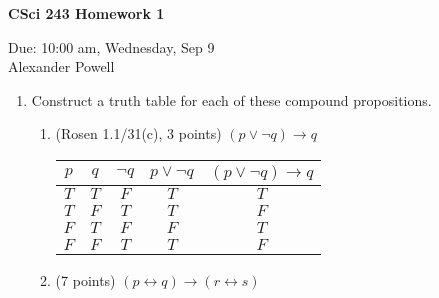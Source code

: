 \documentclass[11pt]{article}
\begin{document}
\begin{center}             %
\begin{LARGE}
{\bf CSci 243 Homework 1}
\end{LARGE}
\vskip 0.25cm      %

Due: 10:00 am, Wednesday, Sep 9 \\  %
Alexander Powell
\end{center}


\begin{enumerate}

\item Construct a truth table for each of these compound propositions.
\begin{enumerate}
\item (Rosen 1.1/31(c), 3 points) $(p\lor \lnot q)\rightarrow q$

\begin{center}
\begin{tabular} {|c|c|c|c|c|}
\hline
$p$ & $q$ & $\lnot q$ & $p \lor \lnot q$ & $(p \lor \lnot q) \rightarrow q$ \\
\hline
$T$ & $T$ & $F$ & $T$ & $T$ \\
$T$ & $F$ & $T$ & $T$ & $F$ \\
$F$ & $T$ & $F$ & $F$ & $T$ \\
$F$ & $F$ & $T$ & $T$ & $F$ \\
\hline
\end{tabular}
\end{center}

\item (7 points) $(p\leftrightarrow q)\rightarrow (r\leftrightarrow s)$


\end{enumerate}
\end{enumerate}
\end{document}
